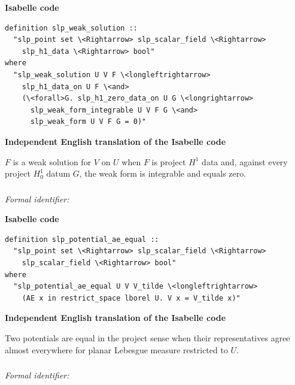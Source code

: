 \documentclass[10pt,oneside]{article}
\newcommand{\reviewlabel}[1]{\par\smallskip\noindent\textsf{\bfseries #1}\par\smallskip}
\begin{document}
\reviewlabel{Isabelle code}
\begin{lstlisting}
definition slp_weak_solution ::
  "slp_point set \<Rightarrow> slp_scalar_field \<Rightarrow>
    slp_h1_data \<Rightarrow> bool"
where
  "slp_weak_solution U V F \<longleftrightarrow>
    slp_h1_data_on U F \<and>
    (\<forall>G. slp_h1_zero_data_on U G \<longrightarrow>
      slp_weak_form_integrable U V F G \<and>
      slp_weak_form U V F G = 0)"
\end{lstlisting}

\reviewlabel{Independent English translation of the Isabelle code}
$F$ is a weak solution for $V$ on $U$ when $F$ is project $H^1$ data and, against every project $H^1_0$ datum $G$, the weak form is integrable and equals zero.

\subsubsection{\texttt{}}
\noindent\textit{Formal identifier:} \texttt{}

\reviewlabel{Isabelle code}
\begin{lstlisting}
definition slp_potential_ae_equal ::
  "slp_point set \<Rightarrow> slp_scalar_field \<Rightarrow>
    slp_scalar_field \<Rightarrow> bool"
where
  "slp_potential_ae_equal U V V_tilde \<longleftrightarrow>
    (AE x in restrict_space lborel U. V x = V_tilde x)"
\end{lstlisting}

\reviewlabel{Independent English translation of the Isabelle code}
Two potentials are equal in the project sense when their representatives agree almost everywhere for planar Lebesgue measure restricted to $U$.

\subsubsection{\texttt{}}
\noindent\textit{Formal identifier:} \texttt{}
\end{document}
